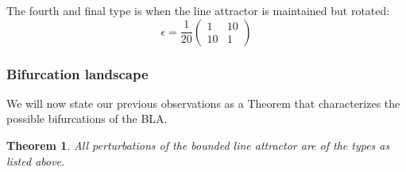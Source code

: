 \documentclass{article} %
\newcounter{ct}
\newtheorem{theorem}{Theorem}
\theoremstyle{definition}
\theoremstyle{remark}
\begin{document}
The fourth and final type is when the line attractor is maintained but rotated:
\begin{equation}
\epsilon =  \frac{1}{20}
\begin{pmatrix}
1 & 10\\
10 & 1
\end{pmatrix}
\end{equation}



\subsubsection{Bifurcation landscape}\label{sec:supp:bifurcationlandscape}
We will now state our previous observations as a Theorem that characterizes the possible bifurcations of the BLA.
\begin{theorem}
All perturbations of the bounded line attractor are of the types as listed above.
\end{theorem}
\end{document}

